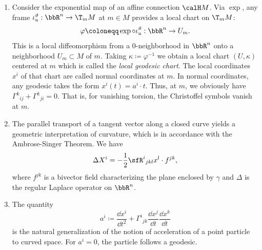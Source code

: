 \begin{rem}\label{rem 2.1.30 RS2}
    \begin{enumerate}
        \item Consider the exponential map of an affine connection $\calH M$. Via $\exp$, any frame $\iota_u^\vartheta:\bbR^n\to \T_m M$ at $m\in M$ provides a local chart on $\T_mM$:
        \[\varphi\coloneqq \exp\circ \iota_u^\vartheta:\bbR^n\to U_m.\]
        This is a local diffeomorphism from a $0$-neighborhood in $\bbR^n$ onto a  neighborhood $U_m\subset M$ of $m$. Taking $\kappa\coloneqq \varphi^{-1}$ we obtain a local chart $(U,\kappa)$ centered at $m$ which is called the \emph{local geodesic chart}. The local coordinates $x^i$ of that chart are called normal coordinates at $m$. In normal coordinates, any geodesic takes the form $x^i(t)=a^i\cdot t$. Thus, at $m$, we obviously have $\varGamma^k{}_{ij}+\varGamma^k{}_{ji}=0$. That is, for vanishing torsion, the Christoffel symbols vanish at $m$.
        \item The parallel transport of a tangent vector along a closed curve yields a geometric interpretation of curvature, which is in accordance with the Ambrose-Singer Theorem. We have 
        \[\Delta X^i=-\frac12 \sfR^i{}_{jkl}x^l\cdot f^{jk},\]
        where $f^{jk}$ is a bivector field characterizing the plane enclosed by $\gamma$ and $\Delta$ is the regular Laplace operator on $\bbR^n$.
        \item The quantity 
        \[a^i\coloneqq \frac{\dd x^i}{\dd t^2}+\varGamma^i{}_{jk}\frac{\dd x^j}{\dd t}\frac{\dd x^k}{\dd t}\]
        is the natural generalization of the notion of acceleration of a point particle to curved space. For $a^i=0$, the particle follows a geodesic.
    \end{enumerate}
\end{rem}

